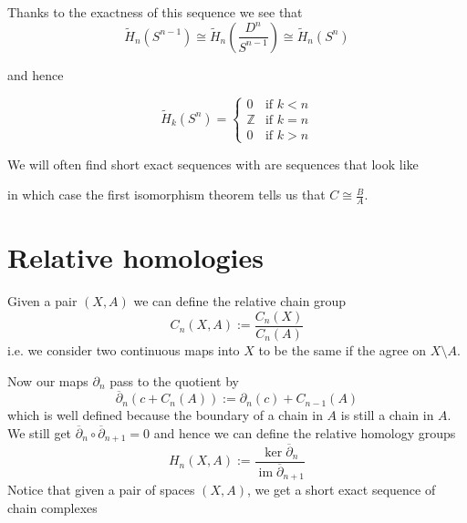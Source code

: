 \documentclass[11pt]{article}
\newcommand{\defeq}{:=}
\DeclareMathOperator{\im}{\mathrm{im}}
\newcommand{\Z}{\mathbb{Z}}
\newcommand{\mdf}[1]{{\color{red} #1}}
\begin{document}
Thanks to the exactness of this sequence we see that
\[
	\widetilde{H}_n(S^{n-1})\cong\widetilde{H}_n\left(\frac{D^n}{S^{n-1}}\right)\cong\widetilde{H}_n(S^n)
\]

and hence

\[
	\widetilde{H}_k(S^n)=
	\begin{cases}
		0 & \text{if }k < n \\
		\Z & \text{if }k =n \\
		0 & \text{if }k > n
	\end{cases}
\]

We will often find \mdf{short exact sequences} with are sequences that look like
\begin{figure}[H]
	\centering
\end{figure}

in which case the first isomorphism theorem tells us that $C\cong\frac{B}{A}$.

\section{Relative homologies}
Given a pair $(X, A)$ we can define the \mdf{relative chain group}
\[
	C_n(X, A)\defeq\frac{C_n(X)}{C_n(A)}
\]
i.e. we consider two continuous maps into $X$ to be the same if the agree on $X\setminus A$.

Now our maps $\partial_n$ pass to the quotient by
\[
	\overline{\partial}_n(c+C_n(A))\defeq\partial_n(c)+C_{n-1}(A)
\]
which is well defined because the boundary of a chain in $A$ is still a chain in $A$.
We still get $\overline{\partial}_n\circ\overline{\partial}_{n+1}=0$ and hence we can define the \mdf{relative homology groups}
\[
	H_n(X, A)\defeq\frac{\ker\overline{\partial}_n}{\im\overline{\partial}_{n+1}}
\]
Notice that given a pair of spaces $(X, A)$, we get a short exact sequence of chain complexes
\begin{figure}[H]
	\centering
\end{figure}
\end{document}
